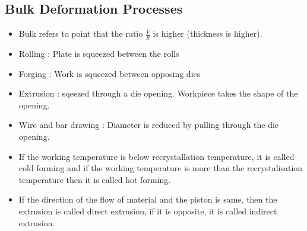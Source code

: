 \documentclass{article}
\begin{document}
	\subsection{Bulk Deformation Processes}
		\begin{itemize}
			\item Bulk refers to point that the ratio $\frac{V}{S}$ is higher (thickness is higher). 
			\item Rolling : Plate is squeezed between the rolls
			\item Forging : Work is squeezed between opposing dies
			\item Extrusion : sqeezed through a die opening. Workpiece takes the shape of the opening.
			\item Wire and bar drawing : Diameter is reduced by pulling through the die opening.
			\item If the working temperature is below recrystallation temperature, it is called cold forming and if the working temperature is more than the recrystalisation temperature then it is called hot forming. 
			\item If the direction of the flow of material and the piston is same, then the extrusion is called direct extrusion, if it is opposite, it is called indirect extrusion.
		\end{itemize}
\end{document}
